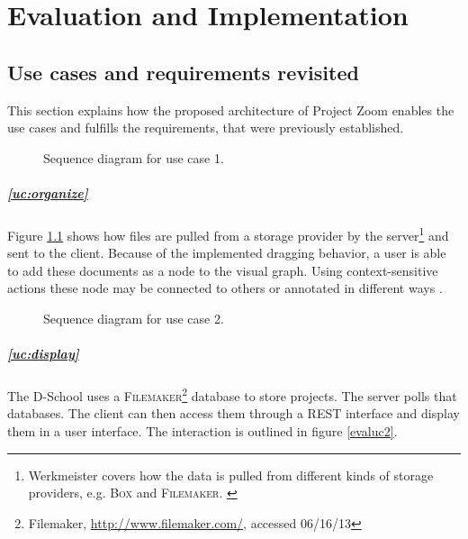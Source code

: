 \chapter{Evaluation and Implementation}

\section{Use cases and requirements revisited}

This section explains how the proposed architecture of Project Zoom enables the use cases and fulfills the requirements, that were previously established.

\begin{figure}
\begin{center}
\caption{Sequence diagram for use case 1.}
\label{fig:evaluc1}
\end{center}
\end{figure}

\paragraph{\ref{uc:organize}} Figure \ref{fig:evaluc1} shows how files are pulled from a storage provider by the server\footnote{Werkmeister covers how the data is pulled from different kinds of storage providers, e.g. \textsc{Box} and \textsc{Filemaker}. \cite{Werkmeister_2013}} and sent to the client. Because of the implemented dragging behavior, a user is able to add these documents as a node to the visual graph. Using context-sensitive actions these node may be connected to others or annotated in different ways \cite{Herold_2013}. 

\begin{figure}
\begin{center}
\caption{Sequence diagram for use case 2.}
\label{fig:evaluc2}
\end{center}
\end{figure}

\paragraph{\ref{uc:display}} The D-School uses a \textsc{Filemaker}\footnote{Filemaker, \url{http://www.filemaker.com/}, accessed 06/16/13} database to store projects. The server polls that databases. The client can then access them through a REST interface and display them in a user interface. The interaction is outlined in figure \ref{evaluc2}.

